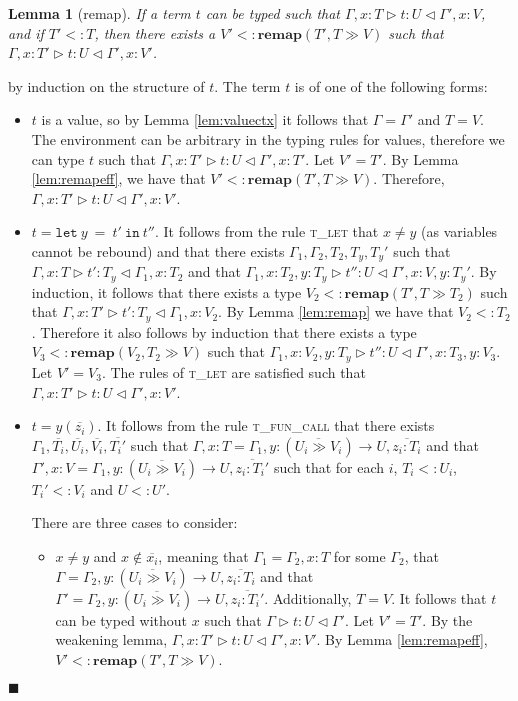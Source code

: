 \documentclass[preprint]{sigplanconf}
\newtheorem{lem}{Lemma}
\newcommand{\lemref}[1]{Lemma \ref{#1}}
\newcommand{\tlet}{\textsc{t\_let} }
\newcommand{\tfunc}{\textsc{t\_fun\_call} }
\newcommand{\remapapp}[3]{\ensuremath{\mathbf{remap}(#1, #2 \gg #3)}}
\newcommand{\typerule}[4]{#1 \triangleright #2 : #3 \triangleleft #4}
\newcommand{\funt}[3]{(\overline{#1 \gg #2}) \rightarrow #3}
\newcommand{\lett}[3]{\mathtt{let}\:#1\:\mathtt{=}\:#2\:\mathtt{in}\:#3}
\newcommand{\qed}{$\blacksquare$}
\newenvironment{proof}{\vspace{1ex}\noindent{\bf Proof}\hspace{0.5em}}
  {\hfill\qed\vspace{1ex}}
\begin{document}
\begin{lem}[remap]
\label{lem:upgrade}
If a term $t$ can be typed such that 
$\typerule{\Gamma, x : T}{t}{U}{\Gamma', x : V}$, and if
$T' <: T$, then there exists a $V' <: \remapapp{T'}{T}{V}$ 
such that $\typerule{\Gamma, x : T'}{t}{U}{\Gamma', x : V'}$.
\end{lem}
\begin{proof}
by induction on the structure of $t$.
The term $t$ is of one of the following forms:

\begin{itemize}
\item $t$ is a value, so by \lemref{lem:valuectx} it follows that
$\Gamma = \Gamma'$ and $T = V$. 
The environment can be arbitrary in the typing rules for values,
therefore we can type $t$ such that 
$\typerule{\Gamma, x : T'}{t}{U}{\Gamma', x : T'}$.
Let $V' = T'$.
By \lemref{lem:remapeff}, we have that $V' <: \remapapp{T'}{T}{V}$.
Therefore, $\typerule{\Gamma, x : T'}{t}{U}{\Gamma', x : V'}$.

\item $t = \lett{y}{t'}{t''}$. It follows from the rule \tlet that
$x \neq y$ (as variables cannot be rebound) and that there exists 
$\Gamma_1, \Gamma_2, T_2, T_y, T_y'$ such that
$\typerule{\Gamma, x : T}{t'}{T_y}{\Gamma_1, x : T_2}$ and that
$\typerule{\Gamma_1, x : T_2, y : T_y}{t''}{U}{\Gamma', x : V, y : T_y'}$.
By induction, it follows that there exists a type $V_2 <: \remapapp{T'}{T}{T_2}$ such that
$\typerule{\Gamma, x : T'}{t'}{T_y}{\Gamma_1, x : V_2}$.
By \lemref{lem:remap} we have that $V_2 <: T_2$.
Therefore it also follows by induction that
there exists a type $V_3 <: \remapapp{V_2}{T_2}{V}$
such that
$\typerule{\Gamma_1, x : V_2, y : T_y}{t''}{U}{\Gamma', x : T_3, y : V_3}$.
Let $V' = V_3$. The rules of \tlet are satisfied such that
$\typerule{\Gamma, x : T'}{t}{U}{\Gamma', x : V'}$.

\item $t = y ( \overline{z_i} )$. 
It follows from the rule \tfunc that there exists
$\Gamma_1, \overline{T_i}, \overline{U_i}, \overline{V_i}, \overline{T_i'}$ 
such that 
$\Gamma, x : T = \Gamma_1, y : \funt{U_i}{V_i}{U}, \overline{z_i : T_i}$
and that
$\Gamma', x : V = \Gamma_1, y : \funt{U_i}{V_i}{U}, \overline{z_i : T_i'}$
such that for each $i$, $T_i <: U_i$, $T_i' <: V_i$ 
and $U <: U'$.

There are three cases to consider:
\begin{itemize}
\item $x \neq y$ and $x \notin \overline{x_i}$, meaning that
$\Gamma_1 = \Gamma_2, x : T$ for some $\Gamma_2$, that
$\Gamma = \Gamma_2, y : \funt{U_i}{V_i}{U}, \overline{z_i : T_i}$
and that $\Gamma' = \Gamma_2, y : \funt{U_i}{V_i}{U}, \overline{z_i : T_i'}$.
Additionally, $T = V$. 
It follows that $t$ can be typed without $x$
such that $\typerule{\Gamma}{t}{U}{\Gamma'}$. Let $V' = T'$.
By the weakening lemma, $\typerule{\Gamma, x : T'}{t}{U}{\Gamma', x : V'}$.
By \lemref{lem:remapeff}, $V' <: \remapapp{T'}{T}{V}$.


\end{itemize}
\end{itemize}
\end{proof}
\end{document}
